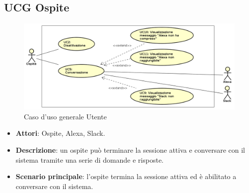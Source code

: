 \documentclass[../AnalisiDeiRequisiti_v3.0.0.tex]{subfiles}
\begin{document}
\subsection{UCG Ospite} 
\label{sssec:UCG_Ospite}
\begin{figure}[!h]
	\centering
	\includegraphics[width=\textwidth]{UseCases/UCG_Ospite/UCG_Ospite.png}
	\caption{Caso d'uso generale Utente}
\end{figure}
\begin{itemize} 
\item \textbf{Attori}: Ospite, Alexa, Slack.
\item \textbf{Descrizione}: un ospite può terminare la sessione attiva e conversare con il sistema tramite una serie di domande e risposte.
\item \textbf{Scenario principale}: l'ospite termina la sessione attiva ed è abilitato a conversare con il sistema.
\end{itemize}
\newpage
\end{document}
